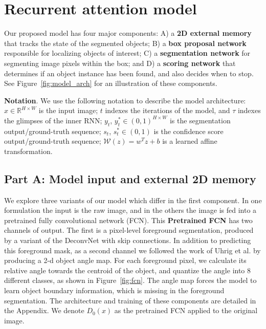 \section{Recurrent attention model} 

Our proposed model has four major components: A) a \textbf{2D external memory}
that tracks the state of the segmented objects; B) a \textbf{box proposal network}
responsible for localizing objects of interest;  C) a \textbf{segmentation network} 
for segmenting image pixels within the box; and D) a \textbf{scoring network} 
that determines if an object instance has been found, and also decides when to stop.
See Figure~\ref{fig:model_arch} for an illustration of these components.



\textbf{Notation}. We use the following notation to describe the model
architecture: $x \in \mathbb{R}^{H \times W}$ is the input image; $t$ indexes
the iterations of the model, and $\tau$ indexes the glimpses of the inner RNN;
$y_{t}$, $y^*_{t} \in (0, 1)^{H \times W}$ is the segmentation 
output/ground-truth sequence; $s_{t}$, $s^*_{t} \in (0, 1)$ is the confidence 
score output/ground-truth sequence; $\mathcal{W}(z) = w^T z + b$ is a learned 
affine transformation.

\subsection{Part A: Model input and external 2D memory}

We explore three variants of our model which differ in the first component. In
one formulation the input is the raw image, and in the others the image is fed
into a pretrained fully convolutional network (FCN). This \textbf{Pretrained
FCN} has two channels of output.  The first is a pixel-level foreground
segmentation, produced by a variant of the DeconvNet \cite{noh15deconv} with
skip connections. In addition to predicting this foreground mask, as a second
channel we followed the work of Uhrig et al. \cite{uhrig16insseg}  by producing
a 2-d object angle map. For each foreground pixel, we calculate its relative
angle towards the centroid of the object, and quantize the angle into 8
different classes, as shown in Figure~\ref{fig:fcn}. The angle map forces the
model to learn object boundary information, which is missing in the foreground
segmentation.  The architecture and training of these components are detailed
in the Appendix. We denote $D_0(x)$ as the pretrained FCN applied to the
original image.

